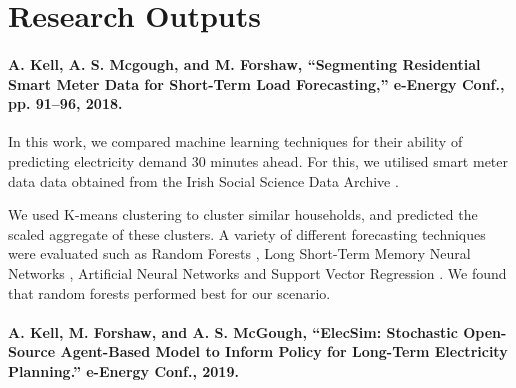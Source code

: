 \documentclass[12pt]{article}
\begin{document}
%





\clearpage

\clearpage

\section{Research Outputs}

\paragraph{A. Kell, A. S. Mcgough, and M. Forshaw, “Segmenting Residential Smart Meter Data for Short-Term Load Forecasting,” e-Energy Conf., pp. 91--96, 2018. \cite{Kell2018}
}


In this work, we compared machine learning techniques for their ability of predicting electricity demand 30 minutes ahead. For this, we utilised smart meter data data obtained from the Irish Social Science Data Archive \cite{cer_2012}.

We used K-means clustering \cite{Forgy65} to cluster similar households, and predicted the scaled aggregate of these clusters. A variety of different forecasting techniques were evaluated such as Random Forests \cite{TinKamHo}, Long Short-Term Memory Neural Networks \cite{lstm}, Artificial Neural Networks \cite{book:984557} and Support Vector Regression \cite{Drucker1997}. We found that random forests performed best for our scenario.


\paragraph{A. Kell, M. Forshaw, and A. S. McGough, “ElecSim: Stochastic Open-Source Agent-Based Model to Inform Policy for Long-Term Electricity Planning.” e-Energy Conf., 2019.
}
\end{document}
